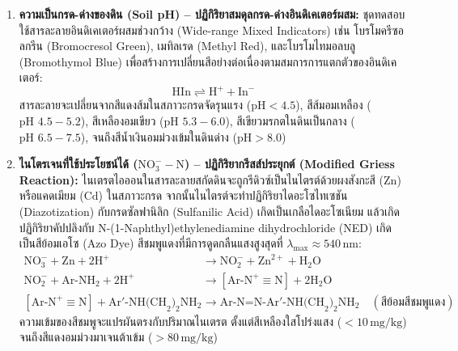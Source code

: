 \begin{enumerate}
    \item \textbf{ความเป็นกรด-ด่างของดิน (Soil pH) -- ปฏิกิริยาสมดุลกรด-ด่างอินดิเคเตอร์ผสม:}
    ชุดทดสอบใช้สารละลายอินดิเคเตอร์ผสมช่วงกว้าง (Wide-range Mixed Indicators) เช่น โบรโมครีซอลกรีน (Bromocresol Green), เมทิลเรด (Methyl Red), และโบรโมไทมอลบลู (Bromothymol Blue) เพื่อสร้างการเปลี่ยนสีอย่างต่อเนื่องตามสมการการแตกตัวของอินดิเคเตอร์:
    \begin{equation}
        \text{HIn} \rightleftharpoons \text{H}^+ + \text{In}^-
        \label{eq:ph_indicator_equilibrium}
    \end{equation}
    สารละลายจะเปลี่ยนจากสีแดงส้มในสภาวะกรดจัดรุนแรง ($\text{pH} < 4.5$), สีส้มอมเหลือง ($\text{pH } 4.5 - 5.2$), สีเหลืองอมเขียว ($\text{pH } 5.3 - 6.0$), สีเขียวมรกตในดินเป็นกลาง ($\text{pH } 6.5 - 7.5$), จนถึงสีน้ำเงินอมม่วงเข้มในดินด่าง ($\text{pH} > 8.0$)

    \item \textbf{ไนโตรเจนที่ใช้ประโยชน์ได้ ($\text{NO}_3^--\text{N}$) -- ปฏิกิริยากรีสส์ประยุกต์ (Modified Griess Reaction):}
    ไนเตรตไอออนในสารละลายสกัดดินจะถูกรีดิวซ์เป็นไนไตรต์ด้วยผงสังกะสี ($\text{Zn}$) หรือแคดเมียม ($\text{Cd}$) ในสภาวะกรด จากนั้นไนไตรต์จะทำปฏิกิริยาไดอะโซไทเซชัน (Diazotization) กับกรดซัลฟานิลิก (Sulfanilic Acid) เกิดเป็นเกลือไดอะโซเนียม แล้วเกิดปฏิกิริยาคัปปลิงกับ N-(1-Naphthyl)ethylenediamine dihydrochloride (NED) เกิดเป็นสีย้อมเอโซ (Azo Dye) สีชมพูแดงที่มีการดูดกลืนแสงสูงสุดที่ $\lambda_{\max} \approx 540\,\text{nm}$:
    \begin{align}
        \text{NO}_3^- + \text{Zn} + 2\text{H}^+ &\longrightarrow \text{NO}_2^- + \text{Zn}^{2+} + \text{H}_2\text{O} \\
        \text{NO}_2^- + \text{Ar-NH}_2 + 2\text{H}^+ &\longrightarrow [\text{Ar-N}^+\equiv\text{N}] + 2\text{H}_2\text{O} \\
        [\text{Ar-N}^+\equiv\text{N}] + \text{Ar}'\text{-NH(CH}_2)_2\text{NH}_2 &\longrightarrow \text{Ar-N=N-Ar}'\text{-NH(CH}_2)_2\text{NH}_2 \quad (\text{สีย้อมสีชมพูแดง})
    \end{align}
    ความเข้มของสีชมพูจะแปรผันตรงกับปริมาณไนเตรต ตั้งแต่สีเหลืองใสโปร่งแสง ($< 10\,\text{mg/kg}$) จนถึงสีแดงอมม่วงมาเจนต้าเข้ม ($> 80\,\text{mg/kg}$)


\end{enumerate}
